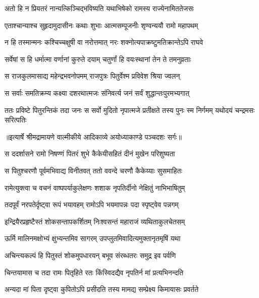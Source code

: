 \twolineshloka
{अतो हि न प्रियतरं नान्यत्किञ्चिद्भविष्यति}
{यथाभिषेको रामस्य राज्येनामिततेजसः} %

\twolineshloka
{एताश्चान्याश्च सुहृदामुदासीनः कथाः शुभाः}
{आत्मसम्पूजनीः शृण्वन्ययौ रामो महापथम्} %

\twolineshloka
{न हि तस्मान्मनः कश्चिच्चक्षुषी वा नरोत्तमात्}
{नरः शक्नोत्यपाक्रष्टुमतिक्रान्तेऽपि राघवे} %

\twolineshloka
{सर्वेषां स हि धर्मात्मा वर्णानां कुरुते दयाम्}
{चतुर्णां हि वयःस्थानां तेन ते तमनुव्रताः} %

\twolineshloka
{स राजकुलमासाद्य महेन्द्रभवनोपमम्}
{राजपुत्रः पितुर्वेश्म प्रविवेश श्रिया ज्वलन्} %

\twolineshloka
{स सर्वाः समतिक्रम्य कक्ष्या दशरथात्मजः}
{संनिवर्त्य जनं सर्वं शुद्धान्तःपुरमभ्यगात्} %

\fourlineindentedshloka
{ततः प्रविष्टे पितुरन्तिकं तदा}
{जनः स सर्वो मुदितो नृपात्मजे}
{प्रतीक्षते तस्य पुनः स्म निर्गमम्}
{यथोदयं चन्द्रमसः सरित्पतिः} %


{॥इत्यार्षे श्रीमद्रामायणे वाल्मीकीये आदिकाव्ये अयोध्याकाण्डे पञ्चदशः सर्गः॥}


\twolineshloka
{स ददर्शासने रामो निषण्णं पितरं शुभे}
{कैकेयीसहितं दीनं मुखेन परिशुष्यता} %

\twolineshloka
{स पितुश्चरणौ पूर्वमभिवाद्य विनीतवत्}
{ततो ववन्दे चरणौ कैकेय्याः सुसमाहितः} %

\twolineshloka
{रामेत्युक्त्वा च वचनं वाष्पपर्याकुलेक्षणः}
{शशाक नृपतिर्दीनो नेक्षितुं नाभिभाषितुम्} %

\twolineshloka
{तदपूर्वं नरपतेर्दृष्ट्वा रूपं भयावहम्}
{रामोऽपि भयमापन्नः पदा स्पृष्ट्वेव पन्नगम्} %

\twolineshloka
{इन्द्रियैरप्रहृष्टैस्तं शोकसन्तापकर्शितम्}
{निःश्वसन्तं महाराजं व्यथिताकुलचेतसम्} %

\twolineshloka
{ऊर्मि मालिनमक्षोभ्यं क्षुभ्यन्तमिव सागरम्}
{उपप्लुतमिवादित्यमुक्तानृतमृषिं यथा} %

\twolineshloka
{अचिन्त्यकल्पं हि पितुस्तं शोकमुपधारयन्}
{बभूव संरब्धतरः समुद्र इव पर्वणि} %

\twolineshloka
{चिन्तयामास च तदा रामः पितृहिते रतः}
{किंस्विदद्यैव नृपतिर्न मां प्रत्यभिनन्दति} %

\twolineshloka
{अन्यदा मां पिता दृष्ट्वा कुपितोऽपि प्रसीदति}
{तस्य मामद्य सम्प्रेक्ष्य किमायासः प्रवर्तते} %

